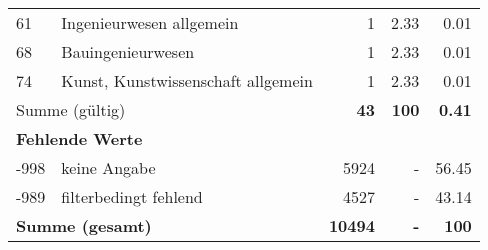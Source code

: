\begin{longtable}{lXrrr}
        61 & \multicolumn{1}{X}{Ingenieurwesen allgemein} & %
          \num{1} &
          \num[round-mode=places,round-precision=2]{2,33} &
          \num[round-mode=places,round-precision=2]{0,01} \\

        68 & \multicolumn{1}{X}{Bauingenieurwesen} & %
          \num{1} &
          \num[round-mode=places,round-precision=2]{2,33} &
          \num[round-mode=places,round-precision=2]{0,01} \\

        74 & \multicolumn{1}{X}{Kunst, Kunstwissenschaft allgemein} & %
          \num{1} &
          \num[round-mode=places,round-precision=2]{2,33} &
          \num[round-mode=places,round-precision=2]{0,01} \\

     \midrule
     \multicolumn{2}{l}{Summe (gültig)} &
       \textbf{\num{43}} &
     \textbf{100} &
       \textbf{\num[round-mode=places,round-precision=2]{0,41}} \\
     \multicolumn{5}{l}{\textbf{Fehlende Werte}}\\
       -998 &
       keine Angabe &
         \num{5924} &
        - &
         \num[round-mode=places,round-precision=2]{56,45} \\
       -989 &
       filterbedingt fehlend &
         \num{4527} &
        - &
         \num[round-mode=places,round-precision=2]{43,14} \\
     \midrule
     \multicolumn{2}{l}{\textbf{Summe (gesamt)}} &
          \textbf{\num{10494}} &
        \textbf{-} &
        \textbf{100} \\
     \bottomrule
     \end{longtable}
     
